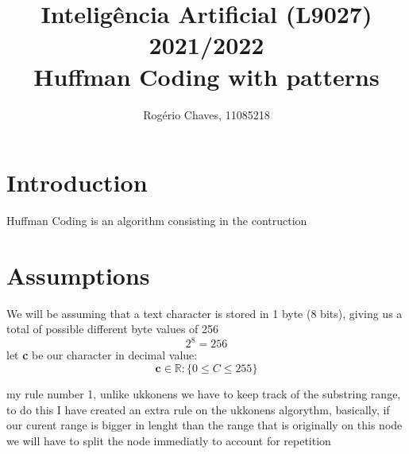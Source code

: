 \documentclass[12pt]{article}
\begin{document}
\title{Inteligência Artificial (L9027) 2021/2022\\\textbf{Huffman Coding with patterns}}
\author{Rogério Chaves, 11085218}
\maketitle

\section{Introduction}
Huffman Coding is an algorithm consisting in the contruction 
\section{Assumptions}
We will be assuming that a text character is stored in 1 byte (8 bits), 
giving us a total of possible different byte values of 256 
\begin{equation}2^8 = 256\end{equation}
let \textbf{c} be our character in decimal value:
\begin{equation}\textbf{c} \in \mathbb{R} : \{0\leq C\leq255\}\end{equation}























my rule number 1, unlike ukkonens we have to keep track of the substring
range, to do this I have created an extra rule on the ukkonens algorythm, basically, if our curent range is bigger in lenght than the range that is 
originally on this node we will have to split the node immediatly to account for repetition
\end{document}
